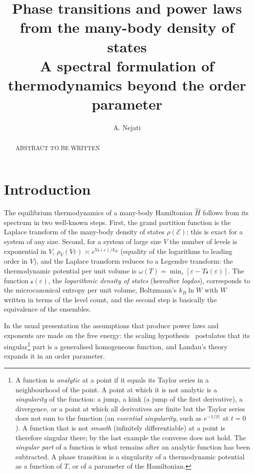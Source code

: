 \documentclass[10pt,a4paper]{article}
\title{Phase transitions and power laws\\ from the many-body density of states\\
\large A spectral formulation of thermodynamics beyond the order parameter}
\author{A. Nejati}
\date{}
\theoremstyle{plain}
\newcommand{\lndos}{{logdos}}  %
\newcommand{\enrg}{\mathcal{E}}  %
\newcommand{\lds}{\mathscr{s}}  %
\begin{document}
\maketitle

\begin{abstract}
  ABSTRACT TO BE WRITTEN
\end{abstract}

\tableofcontents

\section{Introduction}
\label{sec:intro}

The equilibrium thermodynamics of a many-body Hamiltonian $\hat H$ follows
from its spectrum in two well-known steps.
First, the grand partition function is the
Laplace transform of the many-body density of states $\rho(\enrg)$;
this is exact for a system of any size. Second,
for a system of large size $V$ the number of levels is exponential in $V$,
$\rho_V(V\varepsilon)\asymp e^{V\lds(\varepsilon)/k_B}$ (equality of the
logarithms to leading order in $V$), and the Laplace transform reduces to a
Legendre transform: the thermodynamic potential per unit volume is
$\omega(T)=\min_\varepsilon[\varepsilon-T\lds(\varepsilon)]$.
The function $\lds(\varepsilon)$, the
\emph{logarithmic density of states} (hereafter \emph{\lndos}), corresponds to the
microcanonical entropy per unit volume, Boltzmann's $k_B\ln W$ with $W$ written
in terms of the level count, and the second step is basically the equivalence of the
ensembles.

In the usual presentation the assumptions that produce power laws and
exponents are made on the free energy: the scaling
hypothesis~\cite{Widom1965} postulates that its singular\footnote{A function
is \emph{analytic} at a point if it equals its Taylor series in a
neighbourhood of the point. A point at which it is not analytic is a
\emph{singularity} of the function: a jump, a kink (a jump of the first
derivative), a divergence, or a point at which all derivatives are finite
but the Taylor series does not sum to the function (an \emph{essential
singularity}, such as $e^{-1/|t|}$ at $t=0$). A function that is not
\emph{smooth} (infinitely differentiable) at a point is therefore singular
there; by the last example the converse does not hold. The \emph{singular
part} of a function is what remains after an analytic function has been
subtracted. A phase transition is a singularity of a thermodynamic potential
as a function of $T$, or of a parameter of the Hamiltonian.} part is a
generalised homogeneous function, and Landau's theory expands it in an order
parameter.
\end{document}
